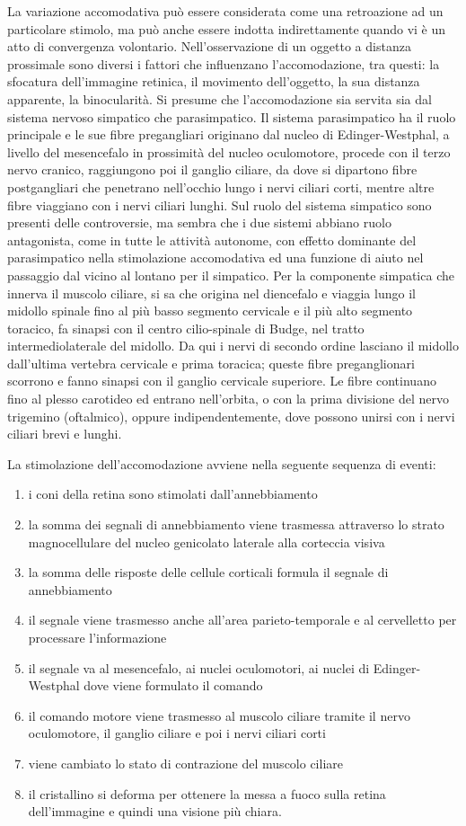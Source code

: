 La variazione accomodativa può essere considerata come una retroazione ad un particolare stimolo, ma può anche essere indotta indirettamente quando vi è un atto di convergenza volontario. Nell’osservazione di un oggetto a distanza prossimale sono diversi i fattori che influenzano l’accomodazione, tra questi: la sfocatura dell’immagine retinica, il movimento dell’oggetto, la sua distanza apparente, la binocularità. Si presume che l’accomodazione sia servita sia dal sistema nervoso simpatico che parasimpatico. Il sistema parasimpatico ha il ruolo principale e le sue fibre pregangliari originano dal nucleo di Edinger-Westphal, a livello del mesencefalo in prossimità del nucleo oculomotore, procede con il terzo nervo cranico, raggiungono poi il ganglio ciliare, da dove si dipartono fibre postgangliari che penetrano nell’occhio lungo i nervi ciliari corti, mentre altre fibre viaggiano con i nervi ciliari lunghi. Sul ruolo del sistema simpatico sono presenti delle controversie, ma sembra che i due sistemi abbiano ruolo antagonista, come in tutte le attività autonome, con effetto dominante del parasimpatico nella stimolazione accomodativa ed una funzione di aiuto nel passaggio dal vicino al lontano per il simpatico. Per la componente simpatica che innerva il muscolo ciliare, si sa che origina nel diencefalo e viaggia lungo il midollo spinale fino al più basso segmento cervicale e il più alto segmento toracico, fa sinapsi con il centro cilio-spinale di Budge, nel tratto intermediolaterale del midollo. Da qui i nervi di secondo ordine lasciano il midollo dall’ultima vertebra cervicale e prima toracica; queste fibre preganglionari scorrono e fanno sinapsi con il ganglio cervicale superiore. Le fibre continuano fino al plesso carotideo ed entrano nell’orbita, o con la prima divisione del nervo trigemino (oftalmico), oppure indipendentemente, dove possono unirsi con i nervi ciliari brevi e lunghi.

La stimolazione dell’accomodazione avviene nella seguente sequenza di eventi:
 \begin{enumerate}
  \itemsep-0.5em 
 \item i coni della retina sono stimolati dall’annebbiamento
 \item la somma dei segnali di annebbiamento viene trasmessa attraverso lo strato magnocellulare del nucleo genicolato laterale alla corteccia visiva
 \item la somma delle risposte delle cellule corticali formula il segnale di annebbiamento
 \item il segnale viene trasmesso anche all’area parieto-temporale e al cervelletto per processare l’informazione
 \item il segnale va al mesencefalo, ai nuclei oculomotori, ai nuclei di Edinger-Westphal dove viene formulato il comando
 \item il comando motore viene trasmesso al muscolo ciliare tramite il nervo oculomotore, il ganglio ciliare e poi i nervi ciliari corti
 \item viene cambiato lo stato di contrazione del muscolo ciliare
 \item il cristallino si deforma per ottenere la messa a fuoco sulla retina dell’immagine e quindi una visione più chiara.
\end{enumerate}

